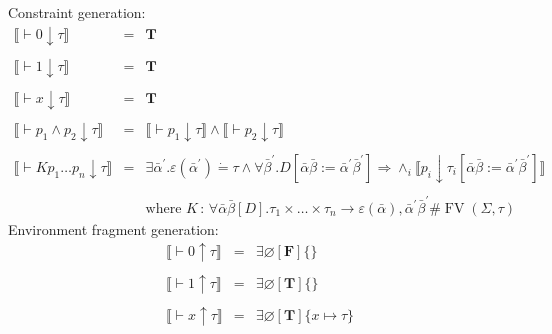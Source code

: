 \documentclass{article}
\newcommand{\assign}{:=}
\newcommand{\colons}{\,:\,}
\newcommand{\nobracket}{}
\newcommand{\tmmathbf}[1]{\ensuremath{\boldsymbol{#1}}}
\newcommand{\tmop}[1]{\ensuremath{\operatorname{#1}}}
\begin{document}
\begin{table}[t]
  Constraint generation:
  \begin{eqnarray*}
    \llbracket \vdash 0 \downarrow \tau \rrbracket \nobracket \nobracket & = &
    \tmmathbf{T}\\
    &  & \\
    \llbracket \vdash 1 \downarrow \tau \rrbracket \nobracket \nobracket & = &
    \tmmathbf{T}\\
    &  & \\
    \llbracket \vdash x \downarrow \tau \rrbracket \nobracket \nobracket & = &
    \tmmathbf{T}\\
    &  & \\
    \llbracket \vdash p_1 \wedge p_2 \downarrow \tau \rrbracket \nobracket
    \nobracket & = & \llbracket \vdash p_1 \downarrow \tau \rrbracket \wedge
    \llbracket \vdash p_2 \downarrow \tau \rrbracket \nobracket \nobracket
    \nobracket \nobracket\\
    &  & \\
    \llbracket \vdash K p_1 \ldots p_n \downarrow \tau \rrbracket \nobracket
    \nobracket & = & \exists \bar{\alpha}^{\prime} . \varepsilon
    (\bar{\alpha}^{\prime}) \dot{=} \tau \wedge \forall \bar{\beta}^{\prime}
    .D [\bar{\alpha} \bar{\beta} \assign \bar{\alpha}^{\prime}
    \bar{\beta}^{\prime}] \Rightarrow \wedge_i \llbracket p_i \downarrow
    \tau_i [\bar{\alpha} \bar{\beta} \assign \bar{\alpha}^{\prime}
    \bar{\beta}^{\prime}] \rrbracket \nobracket \nobracket\\
    &  & \\
    &  & \text{where } K \colons \forall \bar{\alpha} \bar{\beta} [D] .
    \tau_1 \times \ldots \times \tau_n \rightarrow \varepsilon (\bar{\alpha}),
    \bar{\alpha}^{\prime} \bar{\beta}^{\prime} \# \tmop{FV} (\Sigma, \tau)
  \end{eqnarray*}
  Environment fragment generation:
  \begin{eqnarray*}
    \llbracket \vdash 0 \uparrow \tau \rrbracket \nobracket \nobracket & = &
    \exists \varnothing [\tmmathbf{F}] \{\}\\
    &  & \\
    \llbracket \vdash 1 \uparrow \tau \rrbracket \nobracket \nobracket & = &
    \exists \varnothing [\tmmathbf{T}] \{\}\\
    &  & \\
    \llbracket \vdash x \uparrow \tau \rrbracket \nobracket \nobracket & = &
    \exists \varnothing [\tmmathbf{T}] \{x \mapsto \tau\}\\

\end{eqnarray*}
\end{table}
\end{document}
